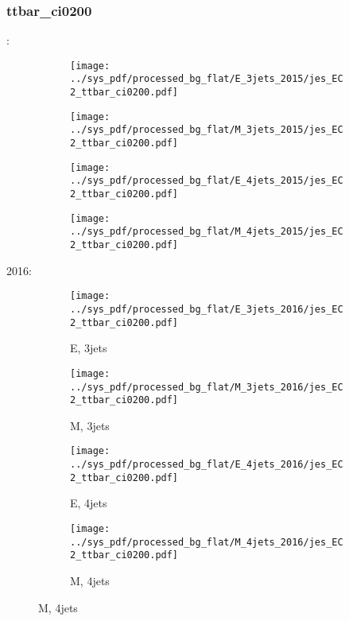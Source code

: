 \documentclass{beamer}
\begin{document}
\begin{frame}
\frametitle{ttbar_ci0200}
\fontsize{5}{1}:
\begin{figure}
\centering
\begin{subfigure}[b]{0.24\textwidth}
\texttt{[image: ../sys\_pdf/processed\_bg\_flat/E\_3jets\_2015/jes\_EC2\_ttbar\_ci0200.pdf]}
\end{subfigure}
\begin{subfigure}[b]{0.24\textwidth}
\texttt{[image: ../sys\_pdf/processed\_bg\_flat/M\_3jets\_2015/jes\_EC2\_ttbar\_ci0200.pdf]}
\end{subfigure}
\begin{subfigure}[b]{0.24\textwidth}
\texttt{[image: ../sys\_pdf/processed\_bg\_flat/E\_4jets\_2015/jes\_EC2\_ttbar\_ci0200.pdf]}
\end{subfigure}
\begin{subfigure}[b]{0.24\textwidth}
\texttt{[image: ../sys\_pdf/processed\_bg\_flat/M\_4jets\_2015/jes\_EC2\_ttbar\_ci0200.pdf]}
\end{subfigure}
\end{figure}
2016:
\begin{figure}
\centering
\begin{subfigure}[b]{0.24\textwidth}
\texttt{[image: ../sys\_pdf/processed\_bg\_flat/E\_3jets\_2016/jes\_EC2\_ttbar\_ci0200.pdf]}
\captionsetup{font=tiny}
\caption{E, 3jets}
\end{subfigure}
\begin{subfigure}[b]{0.24\textwidth}
\texttt{[image: ../sys\_pdf/processed\_bg\_flat/M\_3jets\_2016/jes\_EC2\_ttbar\_ci0200.pdf]}
\captionsetup{font=tiny}
\caption{M, 3jets}
\end{subfigure}
\begin{subfigure}[b]{0.24\textwidth}
\texttt{[image: ../sys\_pdf/processed\_bg\_flat/E\_4jets\_2016/jes\_EC2\_ttbar\_ci0200.pdf]}
\captionsetup{font=tiny}
\caption{E, 4jets}
\end{subfigure}
\begin{subfigure}[b]{0.24\textwidth}
\texttt{[image: ../sys\_pdf/processed\_bg\_flat/M\_4jets\_2016/jes\_EC2\_ttbar\_ci0200.pdf]}
\captionsetup{font=tiny}
\caption{M, 4jets}
\end{subfigure}
\end{figure}
\end{frame}
\end{document}
